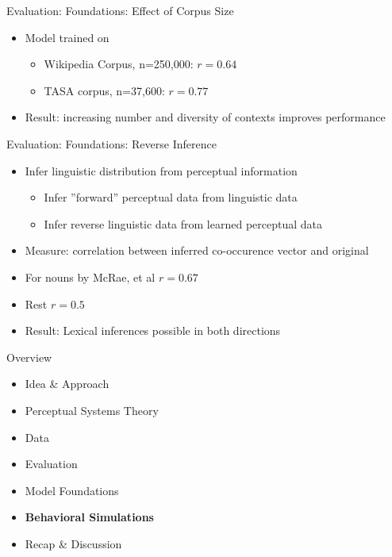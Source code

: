 \documentclass[12pt,a4paper]{beamer}
\begin{document}
\begin{frame}{Evaluation: Foundations: Effect of Corpus Size}
\begin{itemize}
\item Model trained on
    \begin{itemize}
    \item Wikipedia Corpus, n=250,000: $r = 0.64$
    \item TASA corpus, n=37,600: $r = 0.77$
    \end{itemize}
\item Result: increasing number and diversity of contexts improves performance
\end{itemize}
\end{frame}

\begin{frame}{Evaluation: Foundations: Reverse Inference}
\begin{itemize}
\item Infer linguistic distribution from perceptual information
    \begin{itemize}
    \item Infer ''forward'' perceptual data from linguistic data
    \item Infer reverse linguistic data from learned perceptual data
    \end{itemize}
\item Measure: correlation between inferred co-occurence vector and original
\item For nouns by McRae, et al $r = 0.67$
\item Rest $r = 0.5$
\item Result: Lexical inferences possible in both directions
\end{itemize}
\end{frame}


\begin{frame}{Overview}
\begin{itemize}
\item Idea \& Approach 
\item Perceptual Systems Theory
\item Data
\item Evaluation
    \item Model Foundations
    \item \textbf{Behavioral Simulations}
\item Recap \& Discussion
\end{itemize}
\end{frame}
\end{document}

